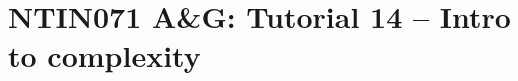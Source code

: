 \documentclass[a4paper,12pt]{amsart}
\begin{document}

\section*{NTIN071 A\&G: Tutorial 14 -- Intro to complexity}


\medskip


\medskip
\end{document}
